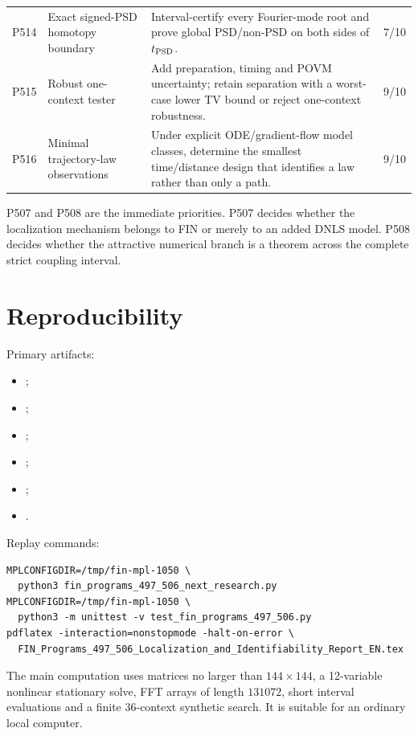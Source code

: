 \documentclass[11pt,a4paper]{article}
\theoremstyle{definition}
\theoremstyle{remark}
\begin{document}
\begin{longtable}{@{}p{}p{}p{}p{}@{}}
P514 & Exact signed-PSD homotopy boundary & Interval-certify every Fourier-mode root and prove global PSD/non-PSD on both sides of $t_{\rm PSD}$. & 7/10\\
P515 & Robust one-context tester & Add preparation, timing and POVM uncertainty; retain separation with a worst-case lower TV bound or reject one-context robustness. & 9/10\\
P516 & Minimal trajectory-law observations & Under explicit ODE/gradient-flow model classes, determine the smallest time/distance design that identifies a law rather than only a path. & 9/10\\
\bottomrule
\end{longtable}

P507 and P508 are the immediate priorities. P507 decides whether the localization mechanism belongs to FIN or merely to an added DNLS model. P508 decides whether the attractive numerical branch is a theorem across the complete strict coupling interval.

\section{Reproducibility}

Primary artifacts:
\begin{itemize}
\item {};
\item {};
\item {};
\item {};
\item {};
\item {}.
\end{itemize}

Replay commands:
\begin{verbatim}
MPLCONFIGDIR=/tmp/fin-mpl-1050 \
  python3 fin_programs_497_506_next_research.py
MPLCONFIGDIR=/tmp/fin-mpl-1050 \
  python3 -m unittest -v test_fin_programs_497_506.py
pdflatex -interaction=nonstopmode -halt-on-error \
  FIN_Programs_497_506_Localization_and_Identifiability_Report_EN.tex
\end{verbatim}

The main computation uses matrices no larger than $144\times144$, a 12-variable nonlinear stationary solve, FFT arrays of length $131072$, short interval evaluations and a finite 36-context synthetic search. It is suitable for an ordinary local computer.
\end{document}

